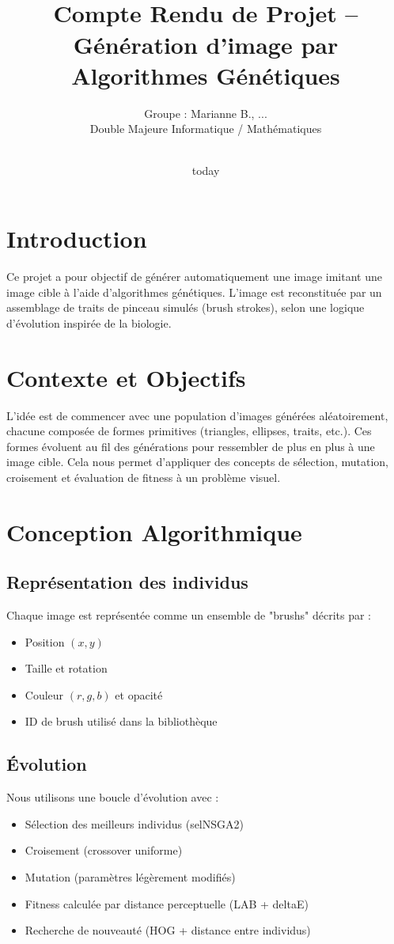 \documentclass[11pt,a4paper]{article}
\title{\\{Compte Rendu de Projet -- Génération d'image par Algorithmes Génétiques}}
\author{Groupe : Marianne B., ... \\[0.2cm]
Double Majeure Informatique / Mathématiques}
\date{\\today}
\begin{document}
\maketitle

\section{Introduction}
Ce projet a pour objectif de générer automatiquement une image imitant une image cible à l'aide d'algorithmes génétiques. L'image est reconstituée par un assemblage de traits de pinceau simulés (brush strokes), selon une logique d'évolution inspirée de la biologie.

\section{Contexte et Objectifs}
L'idée est de commencer avec une population d'images générées aléatoirement, chacune composée de formes primitives (triangles, ellipses, traits, etc.). Ces formes évoluent au fil des générations pour ressembler de plus en plus à une image cible. Cela nous permet d'appliquer des concepts de sélection, mutation, croisement et évaluation de fitness à un problème visuel.

\section{Conception Algorithmique}
\subsection{Représentation des individus}
Chaque image est représentée comme un ensemble de "brushs" décrits par :
\begin{itemize}
    \item Position $(x, y)$
    \item Taille et rotation
    \item Couleur $(r, g, b)$ et opacité
    \item ID de brush utilisé dans la bibliothèque
\end{itemize}

\subsection{Évolution}
Nous utilisons une boucle d'évolution avec :
\begin{itemize}
    \item Sélection des meilleurs individus (selNSGA2)
    \item Croisement (crossover uniforme)
    \item Mutation (paramètres légèrement modifiés)
    \item Fitness calculée par distance perceptuelle (LAB + deltaE)
    \item Recherche de nouveauté (HOG + distance entre individus)
\end{itemize}
\end{document}
